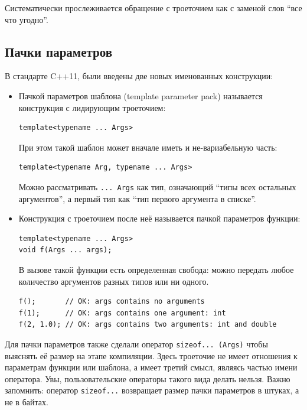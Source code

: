 \documentclass[a4paper,12pt,oneside]{book}
\begin{document}
Систематически прослеживается обращение с троеточием как с заменой слов ``все что угодно''.

\subsection{Пачки параметров}\label{ParamPack}

В стандарте C++11, были введены две новых именованных конструкции: 

\begin{itemize}
\item
Пачкой параметров шаблона (template parameter pack) называется конструкция с лидирующим троеточием:

\begin{lstlisting}
template<typename ... Args>
\end{lstlisting}

При этом такой шаблон может вначале иметь и не-вариабельную часть:

\begin{lstlisting}
template<typename Arg, typename ... Args>
\end{lstlisting}

Можно рассматривать \lstinline!... Args! как тип, означающий ``типы всех остальных аргументов'', а первый тип как ``тип первого аргумента в списке''.

\item
Конструкция с троеточием после неё называется пачкой параметров функции:

\begin{lstlisting}
template<typename ... Args>
void f(Args ... args);
\end{lstlisting}

В вызове такой функции есть определенная свобода: можно передать любое количество аргументов разных типов или ни одного.

\begin{lstlisting}
f();       // OK: args contains no arguments
f(1);      // OK: args contains one argument: int
f(2, 1.0); // OK: args contains two arguments: int and double
\end{lstlisting}
\end{itemize}

Для пачки параметров также сделали оператор \lstinline!sizeof... (Args)! чтобы выяснять её размер на этапе компиляции. Здесь троеточие не имеет отношения к параметрам функции или шаблона, а имеет третий смысл, являясь частью имени оператора. Увы, пользовательские операторы такого вида делать нельзя. Важно запомнить: оператор \lstinline!sizeof...! возвращает размер пачки параметров в штуках, а не в байтах.
\end{document}
